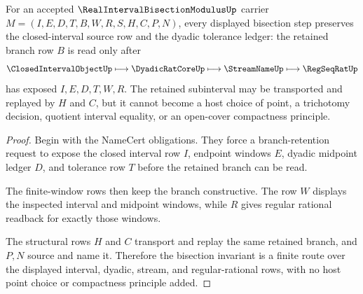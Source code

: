 \begin{theorem}
\label{thm:real-interval-bisection-modulus-bisection-invariant}
For an accepted $\RealIntervalBisectionModulusUp$ carrier $M=(I,E,D,T,B,W,R,S,H,C,P,N)$, every displayed bisection step preserves the closed-interval source row and the dyadic tolerance ledger: the retained branch row $B$ is read only after
$$
\ClosedIntervalObjectUp \longmapsto \DyadicRatCoreUp \longmapsto \StreamNameUp \longmapsto \RegSeqRatUp
$$
has exposed $I,E,D,T,W,R$. The retained subinterval may be transported and replayed by $H$ and $C$, but it cannot become a host choice of point, a trichotomy decision, quotient interval equality, or an open-cover compactness principle.
\end{theorem}
\begin{proof}
Begin with the NameCert obligations. They force a branch-retention request to expose the closed interval row $I$, endpoint windows $E$, dyadic midpoint ledger $D$, and tolerance row $T$ before the retained branch can be read.

The finite-window rows then keep the branch constructive. The row $W$ displays the inspected interval and midpoint windows, while $R$ gives regular rational readback for exactly those windows.

The structural rows $H$ and $C$ transport and replay the same retained branch, and $P,N$ source and name it. Therefore the bisection invariant is a finite route over the displayed interval, dyadic, stream, and regular-rational rows, with no host point choice or compactness principle added.
\end{proof}

